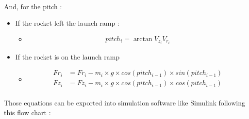 And, for the pitch :
\begin{itemize}
    \item If the rocket left the launch ramp :
          \begin{itemize}
              \item \begin{gather*}
                        pitch_i  = \arctan{V_{z_i}}{V_{r_i}}
                    \end{gather*}
          \end{itemize}
    \item If the rocket is on the launch ramp
          \begin{itemize}
              \item \begin{align*}
                        Fr_i & = Fr_i - m_i \times g \times cos({pitch_{i-1}}) \times sin({pitch_{i-1}}) \\
                        Fz_i & = Fz_i - m_i \times g \times cos({pitch_{i-1}}) \times cos({pitch_{i-1}}) \\
                    \end{align*}
          \end{itemize}
\end{itemize}

\newpage %
Those equations can be exported into simulation software like Simulink
following this flow chart :

